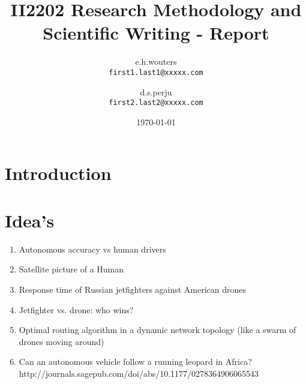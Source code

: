 \documentclass{article}
\title{II2202 Research Methodology and Scientific Writing - Report}
\author{
  e.h.wouters\\
  \texttt{first1.last1@xxxxx.com}
  \and
  d.s.perju\\
  \texttt{first2.last2@xxxxx.com}
}
\date{\today}
\begin{document}
\maketitle

\section{Introduction}

\section{Idea's}
\begin{enumerate}
    \item Autonomous accuracy vs human drivers
    \item Satellite picture of a Human
    \item Response time of Russian jetfighters against American drones
    \item Jetfighter vs. drone: who wins?
    \item Optimal routing algorithm in a dynamic network topology (like a swarm of drones moving around)
    \item Can an autonomous vehicle follow a running leopard in Africa?
    http://journals.sagepub.com/doi/abs/10.1177/0278364906065543



\end{enumerate}
\end{document}
